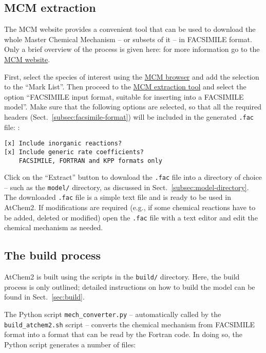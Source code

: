 \subsection{MCM extraction} \label{subsec:mcm-extraction}

The MCM website provides a convenient tool that can be used to
download the whole Master Chemical Mechanism -- or subsets of it -- in
FACSIMILE format. Only a brief overview of the process is given here:
for more information go to the \href{http://mcm.leeds.ac.uk/}{MCM website}.

First, select the species of interest using the
\href{http://mcm.leeds.ac.uk/MCM/roots.htt}{MCM browser} and add the
selection to the ``Mark List''. Then proceed to the
\href{http://mcm.leeds.ac.uk/MCM/extract.htt}{MCM extraction tool} and
select the option ``FACSIMILE input format, suitable for inserting
into a FACSIMILE model''. Make sure that the following options are
selected, so that all the required headers
(Sect.~\ref{subsec:facsimile-format}) will be included in the
generated \texttt{.fac} file: :

\begin{verbatim}
[x] Include inorganic reactions?
[x] Include generic rate coefficients?
    FACSIMILE, FORTRAN and KPP formats only
\end{verbatim}

Click on the ``Extract'' button to download the \texttt{.fac} file
into a directory of choice -- such as the \texttt{model/} directory,
as discussed in Sect.~\ref{subsec:model-directory}. The downloaded
\texttt{.fac} file is a simple text file and is ready to be used in
AtChem2. If modifications are required (e.g., if some chemical
reactions have to be added, deleted or modified) open the
\texttt{.fac} file with a text editor and edit the chemical mechanism
as needed.

\subsection{The build process} \label{subsec:build-process}

AtChem2 is built using the scripts in the \texttt{build/}
directory. Here, the build process is only outlined; detailed
instructions on how to build the model can be found in
Sect.~\ref{sec:build}.

The Python script \texttt{mech\_converter.py} -- automatically called
by the \texttt{build\_atchem2.sh} script -- converts the chemical
mechanism from FACSIMILE format into a format that can be read by the
Fortran code. In doing so, the Python script generates a number of
files:

